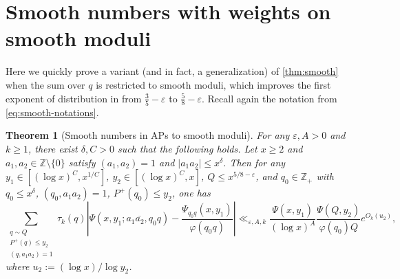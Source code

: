 \documentclass[reqno,11pt]{amsart}
\newtheorem{theorem}{Theorem}[section]
\theoremstyle{remark}
\numberwithin{equation}{section}
\newcommand{\Z}{\mathbb{Z}}
\newcommand{\eps}{\varepsilon}
\renewcommand{\bar}{\overline}
\begin{document}
\section{Smooth numbers with weights on smooth moduli} \label{sec:smooth-weights-smooth}

Here we quickly prove a variant (and in fact, a generalization) of \cref{thm:smooth} when the sum over $q$ is restricted to smooth moduli, which improves the first exponent of distribution in \cite[Th\'eor\`eme 2.1]{de2020niveau} from $\tfrac{3}{5} -\eps$ to $\tfrac{5}{8} -\eps$. Recall again the notation from \cref{eq:smooth-notations}.

\begin{theorem}[Smooth numbers in APs to smooth moduli] \label{thm:smooth-mod-smooth}
For any $\eps, A > 0$ and $k \ge 1$, there exist $\delta, C > 0$ such that the following holds. Let $x \ge 2$ and $a_1, a_2 \in \Z\setminus \{0\}$ satisfy $(a_1, a_2) = 1$ and $|a_1a_2| \le x^\delta$. Then for any $y_1 \in [(\log x)^C, x^{1/C}]$, $y_2 \in [(\log x)^C, x]$, $Q \le x^{5/8 - \eps}$, and $q_0 \in \Z_+$ with $q_0 \le x^\delta$, $(q_0, a_1a_2) = 1$, $P^+(q_0) \le y_2$, one has
\begin{equation} \label{eq:smooth-mod-smooth}
    \sum_{\substack{q \sim Q \\ P^+(q) \le y_2 \\ (q, a_1a_2) = 1}}
    \tau_k(q)
    \left\vert 
    \Psi(x, y_1; a_1\bar{a_2}, q_0q) - 
    \frac{\Psi_{q_0q}(x, y_1)}{\varphi(q_0q)} \right\vert 
    \ll_{\eps,A,k}
    \frac{\Psi(x, y_1)}{(\log x)^A} \frac{\Psi(Q, y_2)}{\varphi(q_0)Q} e^{O_k(u_2)},
\end{equation}
where $u_2 := (\log x)/\log y_2$.
\end{theorem}
\end{document}
